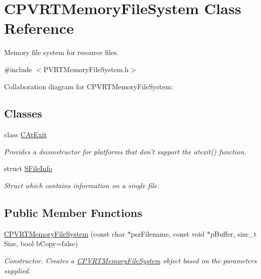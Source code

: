 \hypertarget{class_c_p_v_r_t_memory_file_system}{\section{C\+P\+V\+R\+T\+Memory\+File\+System Class Reference}
\label{class_c_p_v_r_t_memory_file_system}
}


Memory file system for resource files.  




{\ttfamily \#include $<$P\+V\+R\+T\+Memory\+File\+System.\+h$>$}



Collaboration diagram for C\+P\+V\+R\+T\+Memory\+File\+System\+:
\subsection*{Classes}
\begin{DoxyCompactItemize}
\item 
class \hyperlink{class_c_p_v_r_t_memory_file_system_1_1_c_at_exit}{C\+At\+Exit}
\begin{DoxyCompactList}\small\item\em Provides a deconstructor for platforms that don't support the atexit() function. \end{DoxyCompactList}\item 
struct \hyperlink{struct_c_p_v_r_t_memory_file_system_1_1_s_file_info}{S\+File\+Info}
\begin{DoxyCompactList}\small\item\em Struct which contains information on a single file. \end{DoxyCompactList}\end{DoxyCompactItemize}
\subsection*{Public Member Functions}
\begin{DoxyCompactItemize}
\item 
\hyperlink{class_c_p_v_r_t_memory_file_system_a7a4dc2115292678d32102bc17143b2f7}{C\+P\+V\+R\+T\+Memory\+File\+System} (const char $\ast$psz\+Filename, const void $\ast$p\+Buffer, size\+\_\+t Size, bool b\+Copy=false)
\begin{DoxyCompactList}\small\item\em Constructor. Creates a \hyperlink{class_c_p_v_r_t_memory_file_system}{C\+P\+V\+R\+T\+Memory\+File\+System} object based on the parameters supplied. \end{DoxyCompactList}\end{DoxyCompactItemize}
